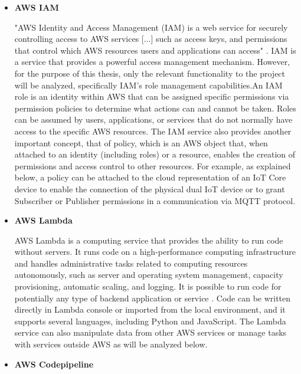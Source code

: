 \begin{itemize}
    \item \textbf{AWS IAM}
    
    "AWS Identity and Access Management (IAM) is a web service for securely controlling access to AWS services [...] such as access keys, and permissions that control which AWS resources users and applications can access" \cite{AWSIAM}. IAM is a service that provides a powerful access management mechanism. However, for the purpose of this thesis, only the relevant functionality to the project will be analyzed, specifically IAM's role management capabilities.An IAM role is an identity within AWS that can be assigned specific permissions via permission policies to determine what actions can and cannot be taken. Roles can be assumed by users, applications, or services that do not normally have access to the specific AWS resources. The IAM service also provides another important concept, that of policy, which is an AWS object that, when attached to an identity (including roles) or a resource, enables the creation of permissions and access control to other resources. For example, as explained below, a policy can be attached to the cloud representation of an IoT Core device to enable the connection of the physical dual IoT device or to grant Subscriber or Publisher permissions in a communication via MQTT protocol.
    \item \textbf{AWS Lambda}
    
    AWS Lambda is a computing service that provides the ability to run code without servers. It runs code on a high-performance computing infrastructure and handles administrative tasks related to computing resources autonomously, such as server and operating system management, capacity provisioning, automatic scaling, and logging. It is possible to run code for potentially any type of backend application or service \cite{AWSLambda}. Code can be written directly in Lambda console or imported from the local environment, and it supports several languages, including Python and JavaScript. The Lambda service can also manipulate data from other AWS services or manage tasks with services outside AWS as will be analyzed below.
    \item \textbf{AWS Codepipeline}
    

\end{itemize}
